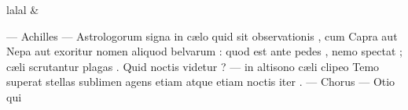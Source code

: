 \documentclass[12pt,onecolumn,twoside,a4paper]{memoir}
\begin{document}
               \begin{pairs}
                  \begin{Leftside}
			\beginnumbering
			\setcounter{stanzaL}{0}
                     
                        
                         \stanza 
                     lalal \&
                        
                        
                        
                        
                         \stanza 
                     —
                              Achilles
                              —
                              Astrologorum
                              signa
                              in
                              cælo
                              quid
                              sit
                              observationis
                              ,
                              cum
                              Capra
                              aut
                              Nepa
                              aut
                              exoritur
                              nomen
                              aliquod
                              belvarum
                              :
                              quod
                              est
                              ante
                              pedes
                              ,
                              nemo
                              spectat
                              ;
                              cæli
                              scrutantur
                              plagas
                              .
                              Quid
                              noctis
                              videtur
                              ?
                              —
                              in
                              altisono
                              cæli
                              clipeo
                              Temo
                              superat
                              stellas
                              sublimen
                              agens
                              etiam
                              atque
                              etiam
                              noctis
                              iter
                              .
                              —
                              Chorus
                              —
                              Otio
                              qui

\end{Leftside}
\end{pairs}
\end{document}
